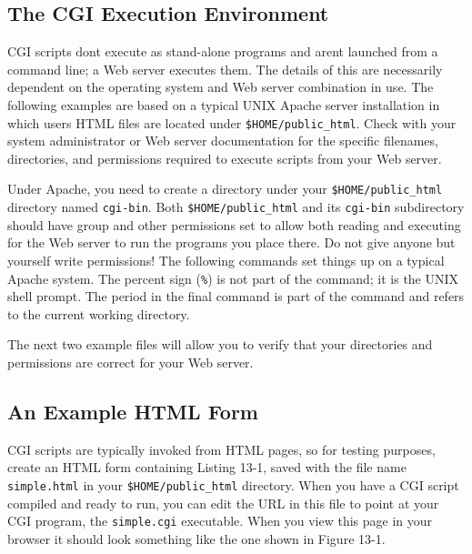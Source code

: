 {\subsection{The CGI Execution Environment}

CGI scripts don{\textquotesingle}t execute as stand-alone programs and
aren{\textquotesingle}t launched from a command line; a Web server
executes them. The details of this are necessarily dependent on the
operating system and Web server combination in use. The following
examples are based on a typical UNIX Apache server installation in
which users{\textquotesingle} HTML files are located under
\texttt{\$HOME/public\_html}. Check with your system administrator or
Web server documentation for the specific filenames, directories, and
permissions required to execute scripts from your Web server. 

Under Apache, you need to create a directory under your
\texttt{\$HOME/public\_html} directory named \texttt{cgi-bin}. Both
\texttt{\$HOME/public\_html} and its \texttt{cgi-bin} subdirectory
should have {\textquotedbl}group{\textquotedbl} and
{\textquotedbl}other{\textquotedbl} permissions set to allow both
reading and executing for the Web server to run the programs you place
there. Do not give anyone but yourself write permissions! The following
commands set things up on a typical Apache system. The percent sign
(\texttt{\%}) is not part of the command; it is the UNIX shell prompt.
The period in the final command is part of the command and refers to
the current working directory.


The next two example files will allow you to verify that your
directories and permissions are correct for your Web server.

\subsection{An Example HTML Form}

CGI scripts are typically invoked from HTML pages, so for testing
purposes, create an HTML form containing Listing 13-1, saved with the
file name \texttt{simple.html} in your \texttt{\$HOME/public\_html}
directory. When you have a CGI script compiled and ready to run, you
can edit the URL in this file to point at your CGI program, the
\texttt{simple.cgi} executable. When you view this page in your browser
it should look something like the one shown in Figure 13-1.

}
